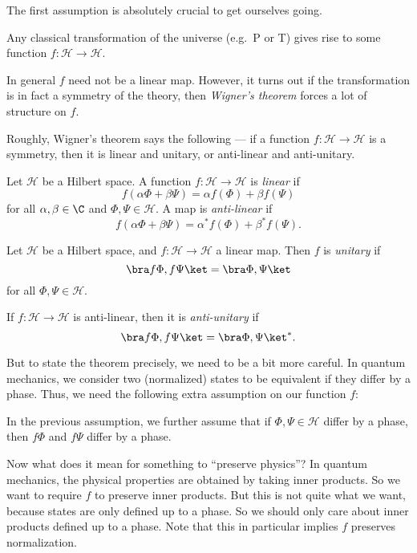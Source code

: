 \documentclass[a4paper]{article}
\begin{document}
The first assumption is absolutely crucial to get ourselves going.
\begin{assumption}
  Any classical transformation of the universe (e.g.\ P or T) gives rise to some function $f: \mathcal{H} \to \mathcal{H}$.
\end{assumption}
In general $f$ need not be a linear map. However, it turns out if the transformation is in fact a symmetry of the theory, then \emph{Wigner's theorem} forces a lot of structure on $f$.

Roughly, Wigner's theorem says the following --- if a function $f: \mathcal{H} \to \mathcal{H}$ is a symmetry, then it is linear and unitary, or anti-linear and anti-unitary.
\begin{defi}
  Let $\mathcal{H}$ be a Hilbert space. A function $f: \mathcal{H} \to \mathcal{H}$ is \emph{linear} if
  \[
    f(\alpha \Phi + \beta \Psi) = \alpha f(\Phi) + \beta f(\Psi)
  \]
  for all $\alpha, \beta \in \C$ and $\Phi, \Psi \in \mathcal{H}$. A map is \emph{anti-linear} if
  \[
    f(\alpha \Phi + \beta \Psi) = \alpha^* f(\Phi) + \beta^* f(\Psi).
  \]
\end{defi}
\begin{defi}
  Let $\mathcal{H}$ be a Hilbert space, and $f: \mathcal{H} \to \mathcal{H}$ a linear map. Then $f$ is \emph{unitary} if
  \[
    \bra f \Phi, f \Psi\ket = \bra \Phi, \Psi\ket
  \]
  for all $\Phi, \Psi \in \mathcal{H}$.

  If $f: \mathcal{H} \to \mathcal{H}$ is anti-linear, then it is \emph{anti-unitary} if
  \[
    \bra f \Phi, f \Psi\ket = \bra \Phi, \Psi\ket^*.
  \]
\end{defi}
But to state the theorem precisely, we need to be a bit more careful. In quantum mechanics, we consider two (normalized) states to be equivalent if they differ by a phase. Thus, we need the following extra assumption on our function $f$:
\begin{assumption}
  In the previous assumption, we further assume that if $\Phi, \Psi \in \mathcal{H}$ differ by a phase, then $f\Phi$ and $f\Psi$ differ by a phase.
\end{assumption}
Now what does it mean for something to ``preserve physics''? In quantum mechanics, the physical properties are obtained by taking inner products. So we want to require $f$ to preserve inner products. But this is not quite what we want, because states are only defined up to a phase. So we should only care about inner products defined up to a phase. Note that this in particular implies $f$ preserves normalization.
\end{document}
